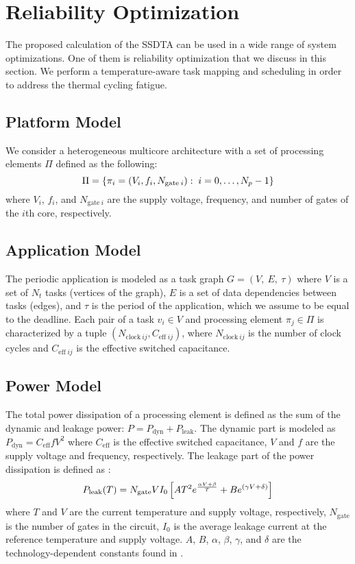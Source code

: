 \section{Reliability Optimization}

The proposed calculation of the SSDTA can be used in a wide range of system
optimizations. One of them is reliability optimization that we discuss in this
section. We perform a temperature-aware task mapping and scheduling in order to
address the thermal cycling fatigue.

\subsection{Platform Model}

We consider a heterogeneous multicore architecture with a set of processing
elements $\Pi$ defined as the following:
\[
  \Pi = \{ \pi_i = (V_i, f_i, N_{\text{gate} \: i}): \; i = 0, \dots, N_p - 1 \}
\]
where $V_i$, $f_i$, and $N_{\text{gate} \: i}$ are the supply voltage,
frequency, and number of gates \cite{liao2005} of the $i$th core, respectively.

\subsection{Application Model}

The periodic application is modeled as a task graph $G = (V, \: E, \: \tau)$
where $V$ is a set of $N_t$ tasks (vertices of the graph), $E$ is a set of data
dependencies between tasks (edges), and $\tau$ is the period of the application,
which we assume to be equal to the deadline. Each pair of a task $v_i \in V$ and
processing element $\pi_j \in \Pi$ is characterized by a tuple $(N_{\text{clock}
\: ij}, C_{\text{eff} \; ij})$, where $N_{\text{clock} \: ij}$ is the number of
clock cycles and $C_{\text{eff} \; ij}$ is the effective switched capacitance.

\subsection{Power Model}

The total power dissipation of a processing element is defined as the sum of the
dynamic and leakage power: $P = P_\text{dyn} + P_\text{leak}$. The dynamic part
is modeled as $P_\text{dyn} = C_\text{eff} f V^2$ where $C_\text{eff}$ is the
effective switched capacitance, $V$ and $f$ are the supply voltage and
frequency, respectively. The leakage part of the power dissipation is defined as
\cite{liao2005}:
\begin{equation} \elab{total-power}
  P_\text{leak}(T) = N_\text{gate} V I_0 \left[ A T^2 e^{\frac{\alpha V + \beta}{T}} + B e^{(\gamma V + \delta)} \right]
\end{equation}
where $T$ and $V$ are the current temperature and supply voltage, respectively,
$N_\text{gate}$ is the number of gates in the circuit, $I_0$ is the average
leakage current at the reference temperature and supply voltage. $A$, $B$,
$\alpha$, $\beta$, $\gamma$, and $\delta$ are the technology-dependent constants
found in \cite{liao2005}.

